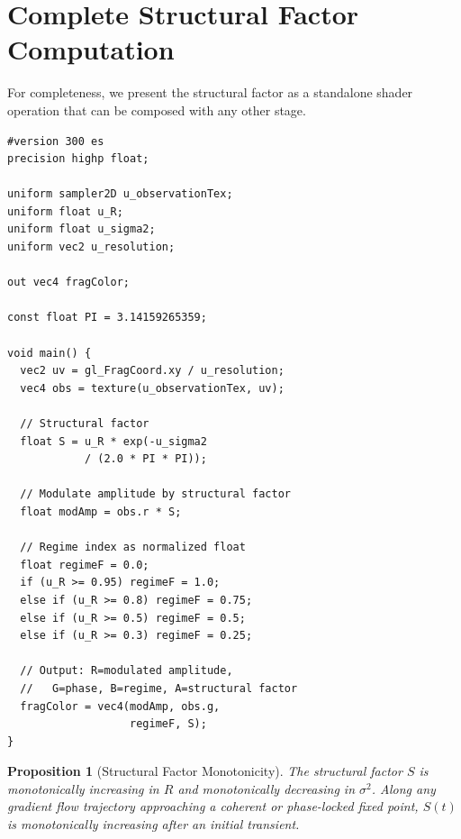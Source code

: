 \documentclass[11pt,twocolumn,a4paper]{article}
\newtheorem{proposition}[theorem]{Proposition}
\begin{document}

\section{Complete Structural Factor Computation}
\label{sec:sf-shader}

For completeness, we present the structural factor as a standalone shader operation that can be composed with any other stage.

\begin{lstlisting}[style=glsl,caption={Structural factor computation shader. Evaluates $S = R\exp(-\sigma^2/2\pi^2)$ as a per-texel operation and outputs it alongside the regime-encoded partition value. The structural factor modulates the amplitude channel of the observation texture.},label=lst:structural]
#version 300 es
precision highp float;

uniform sampler2D u_observationTex;
uniform float u_R;
uniform float u_sigma2;
uniform vec2 u_resolution;

out vec4 fragColor;

const float PI = 3.14159265359;

void main() {
  vec2 uv = gl_FragCoord.xy / u_resolution;
  vec4 obs = texture(u_observationTex, uv);

  // Structural factor
  float S = u_R * exp(-u_sigma2
            / (2.0 * PI * PI));

  // Modulate amplitude by structural factor
  float modAmp = obs.r * S;

  // Regime index as normalized float
  float regimeF = 0.0;
  if (u_R >= 0.95) regimeF = 1.0;
  else if (u_R >= 0.8) regimeF = 0.75;
  else if (u_R >= 0.5) regimeF = 0.5;
  else if (u_R >= 0.3) regimeF = 0.25;

  // Output: R=modulated amplitude,
  //   G=phase, B=regime, A=structural factor
  fragColor = vec4(modAmp, obs.g,
                   regimeF, S);
}
\end{lstlisting}

\begin{proposition}[Structural Factor Monotonicity]
\label{prop:sf-monotonicity}
The structural factor $S$ is monotonically increasing in $R$ and monotonically decreasing in $\sigma^2$.
Along any gradient flow trajectory approaching a coherent or phase-locked fixed point, $S(t)$ is monotonically increasing after an initial transient.
\end{proposition}
\end{document}
